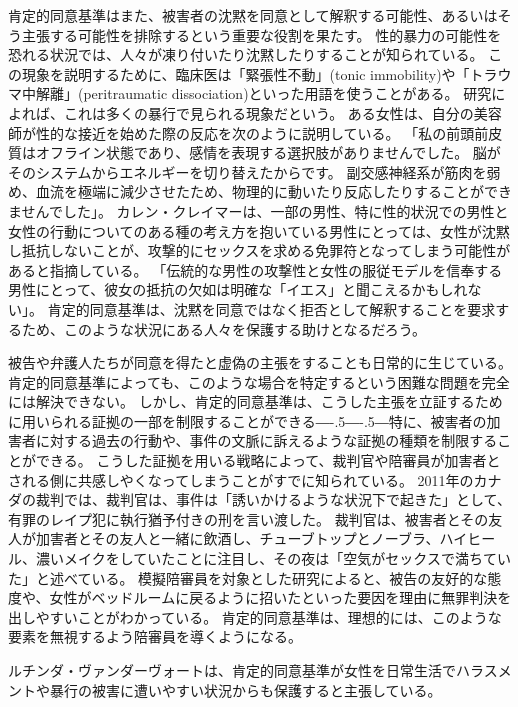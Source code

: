 \documentclass[paper=a4,book,openany]{jlreq}
\newcommand{\ig}[1]{}           %
\def\DDASH{―\kern-.5\zw―\kern-.5\zw―}
\begin{document}
肯定的同意基準はまた、被害者の沈黙を同意として解釈する可能性、あるいはそう主張する可能性を排除するという重要な役割を果たす。
性的暴力の可能性を恐れる状況では、人々が凍り付いたり沈黙したりすることが知られている。
この現象を説明するために、臨床医は「緊張性不動」(tonic immobility)や「トラウマ中解離」(peritraumatic dissociation)といった用語を使うことがある。
研究によれば、これは多くの暴行で見られる現象だという\citep{moller17:_tonic_immob_durin_sexual_assaul}。
ある女性は、自分の美容師が性的な接近を始めた際の反応を次のように説明している。
「私の前頭前皮質はオフライン状態であり、感情を表現する選択肢がありませんでした。
脳がそのシステムからエネルギーを切り替えたからです。
副交感神経系が筋肉を弱め、血流を極端に減少させたため、物理的に動いたり反応したりすることができませんでした」\citep{corvo18:_why_i_froze_smiled_durin}。
カレン・クレイマー\ig{Karen Kramer}は、一部の男性、特に性的状況での男性と女性の行動についてのある種の考え方を抱いている男性にとっては、女性が沈黙し抵抗しないことが、攻撃的にセックスを求める免罪符となってしまう可能性があると指摘している。
「伝統的な男性の攻撃性と女性の服従モデルを信奉する男性にとって、彼女の抵抗の欠如は明確な「イエス」と聞こえるかもしれない」\citep[p.121]{kramer94:_rule_myth}。
肯定的同意基準は、沈黙を同意ではなく拒否として解釈することを要求するため、このような状況にある人々を保護する助けとなるだろう。

被告や弁護人たちが同意を得たと虚偽の主張をすることも日常的に生じている。
肯定的同意基準によっても、このような場合を特定するという困難な問題を完全には解決できない。
しかし、肯定的同意基準は、こうした主張を立証するために用いられる証拠の一部を制限することができる{\DDASH}特に、被害者の加害者に対する過去の行動や、事件の文脈に訴えるような証拠の種類を制限することができる。
こうした証拠を用いる戦略によって、裁判官や陪審員が加害者とされる側に共感しやくなってしまうことがすでに知られている。
2011年のカナダの裁判では、裁判官は、事件は「誘いかけるような状況下で起きた」として、有罪のレイプ犯に執行猶予付きの刑を言い渡した。
裁判官は、被害者とその友人が加害者とその友人と一緒に飲酒し、チューブトップとノーブラ、ハイヒール、濃いメイクをしていたことに注目し、その夜は「空気がセックスで満ちていた」と述べている\citep{cbc11:_manit_judge_rebuk_sex_assaul_remar}。
模擬陪審員を対象とした研究によると、被告の友好的な態度や、女性がベッドルームに戻るように招いたといった要因を理由に無罪判決を出しやすいことがわかっている\citep{finch06:_break_bound}。
肯定的同意基準は、理想的には、このような要素を無視するよう陪審員を導くようになる。

ルチンダ・ヴァンダーヴォート\ig{Lucinda Vandervort}は、肯定的同意基準が女性を日常生活でハラスメントや暴行の被害に遭いやすい状況からも保護すると主張している。
\end{document}
